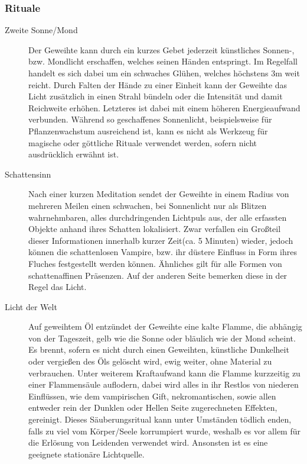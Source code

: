 \documentclass[a4paper,12pt,oneside]{book}
\begin{document}
\subsubsection{Rituale}
\begin{description}
\item[Zweite Sonne/Mond]Der Geweihte kann durch ein kurzes Gebet jederzeit künstliches Sonnen-, bzw. Mondlicht erschaffen, welches seinen Händen entspringt. Im Regelfall handelt es sich dabei um ein schwaches Glühen, welches höchstens 3m weit reicht. Durch Falten der Hände zu einer Einheit kann der Geweihte das Licht zusätzlich in einen Strahl bündeln oder die Intensität und damit Reichweite erhöhen. Letzteres ist dabei mit einem höheren Energieaufwand verbunden. Während so geschaffenes Sonnenlicht, beispielsweise für Pflanzenwachstum ausreichend ist, kann es nicht als Werkzeug für magische oder göttliche Rituale verwendet werden, sofern nicht ausdrücklich erwähnt ist.
\item[Schattensinn]Nach einer kurzen Meditation sendet der Geweihte in einem Radius von mehreren Meilen einen schwachen, bei Sonnenlicht nur als Blitzen wahrnehmbaren, alles durchdringenden Lichtpuls aus, der alle erfassten Objekte anhand ihres Schatten lokalisiert. Zwar verfallen ein Großteil dieser Informationen innerhalb kurzer Zeit(ca. 5 Minuten) wieder, jedoch können die schattenlosen Vampire, bzw. ihr düstere Einfluss in Form ihres Fluches festgestellt werden können. Ähnliches gilt für alle Formen von schattenaffinen Präsenzen. Auf der anderen Seite bemerken diese in der Regel das Licht.
\item[Licht der Welt]Auf geweihtem Öl entzündet der Geweihte eine kalte Flamme, die abhängig von der Tageszeit, gelb wie die Sonne oder bläulich wie der Mond scheint. Es brennt, sofern es nicht durch einen Geweihten, künstliche Dunkelheit oder vergießen des Öls gelöscht wird, ewig weiter, ohne Material zu verbrauchen. Unter weiterem Kraftaufwand kann die Flamme kurzzeitig zu einer Flammensäule auflodern, dabei wird alles in ihr Restlos von niederen Einflüssen, wie dem vampirischen Gift, nekromantischen, sowie allen entweder rein der Dunklen oder Hellen Seite zugerechneten Effekten, gereinigt. Dieses Säuberungsritual kann unter Umständen tödlich enden, falls zu viel vom Körper/Seele korrumpiert wurde, weshalb es vor allem für die Erlösung von Leidenden verwendet wird. Ansonsten ist es eine geeignete stationäre Lichtquelle.
\end{description}
\end{document}
